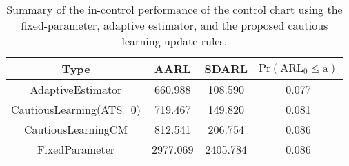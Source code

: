 \begin{table}[!h]

\caption{Summary of the in-control performance of the control chart using the fixed-parameter, adaptive estimator, and the proposed cautious learning update rules.}
\centering
\begin{tabular}[t]{cccc}
\toprule
Type & AARL & SDARL & $\text{Pr}(\text{ARL}_0 \leq \text{a})$\\
\midrule
AdaptiveEstimator & 660.988 & 108.590 & 0.077\\
CautiousLearning(ATS=0) & 719.467 & 149.820 & 0.081\\
CautiousLearningCM & 812.541 & 206.754 & 0.086\\
FixedParameter & 2977.069 & 2405.784 & 0.086\\
\bottomrule
\end{tabular}
\end{table}
